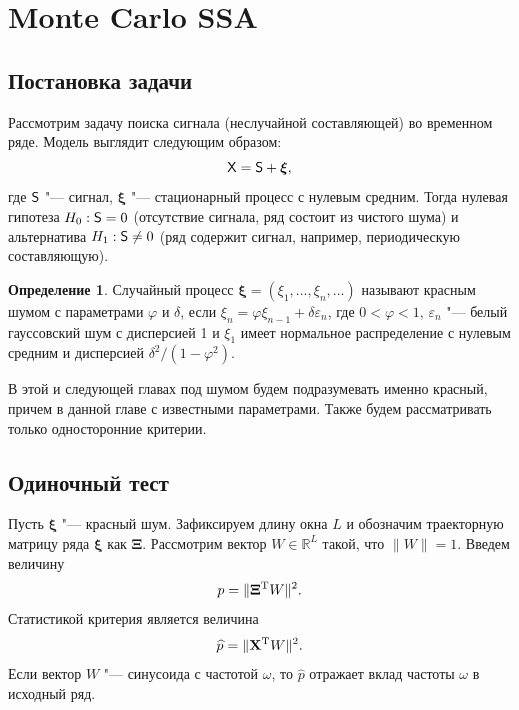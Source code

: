 \documentclass[specialist,
substylefile = spbu_report.rtx,
subf,href,colorlinks=true, 12pt]{disser}
\theoremstyle{definition}
\newtheorem{definition}{Определение}
\newcommand{\R}{\mathbb{R}}
\newcommand{\bfxi}{\boldsymbol{\xi}}
\begin{document}
\section{Monte Carlo SSA}\label{sect:mc-ssa}
\subsection{Постановка задачи}
Рассмотрим задачу поиска сигнала (неслучайной составляющей) во временном ряде. Модель выглядит следующим образом:
\[
\tX=\tS + \bfxi,
\]
где $\mathsf{S}$ "--- сигнал, $\bfxi$ "--- стационарный процесс с нулевым средним. Тогда нулевая гипотеза $H_0:\mathsf{S}=0$ (отсутствие сигнала, ряд состоит из чистого шума) и альтернатива $H_1:\mathsf{S}\ne0$ (ряд содержит сигнал, например, периодическую составляющую). 
\begin{definition}
	Случайный процесс $\bfxi=(\xi_1,\dots,\xi_n, \ldots)$ называют красным шумом с параметрами $\varphi$ и $\delta$, если $\xi_n = \varphi\xi_{n-1} + \delta\varepsilon_n$, где $0<\varphi<1$, $\varepsilon_n$ "--- белый гауссовский шум с дисперсией 1 и $\xi_1$ имеет нормальное распределение с нулевым средним и дисперсией $\delta^2/(1-\varphi^2)$.
\end{definition}
В этой и следующей главах под шумом будем подразумевать именно красный, причем в данной главе с известными параметрами.   Также будем рассматривать только односторонние критерии.

\subsection{Одиночный тест}\label{sect:single_test}
Пусть $\bfxi$ "--- красный шум. Зафиксируем длину окна $L$ и обозначим траекторную матрицу ряда $\bfxi$ как $\mathbf\Xi$. Рассмотрим вектор $W\in \R^{L}$ такой, что $\|W\|=1$. Введем величину
\[
	p=\|\mathbf{\Xi}^{\mathrm{T}} W\|^2.
\]
Статистикой критерия является величина
\[
	\widehat{p}=\|\mathbf{X}^{\mathrm{T}} W\|^2.
\]
Если вектор $W$ "--- синусоида с частотой $\omega$, то $\widehat{p}$ отражает вклад частоты $\omega$ в исходный ряд.
\end{document}
